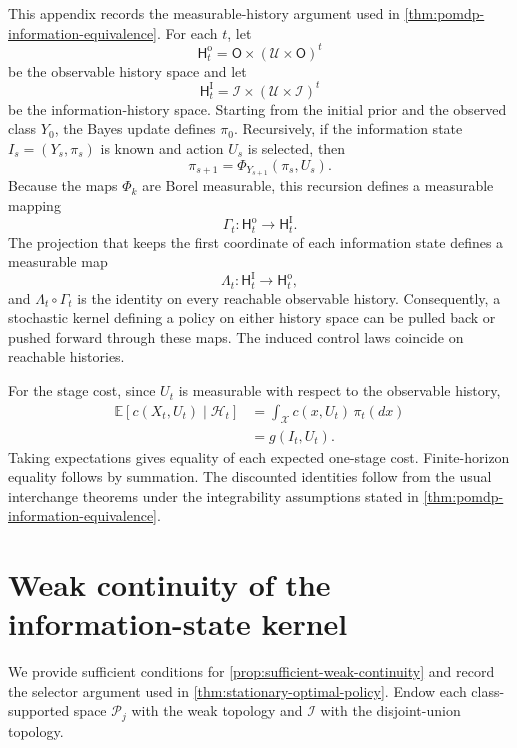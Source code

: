 \documentclass[10pt,twocolumn]{article}
\theoremstyle{remark}
\newcommand{\E}{\mathbb{E}}
\newcommand{\Hh}{\mathcal{H}}
\newcommand{\Pcal}{\mathcal{P}}
\newcommand{\Ucal}{\mathcal{U}}
\newcommand{\Xcal}{\mathcal{X}}
\newcommand{\Ical}{\mathcal{I}}
\begin{document}
This appendix records the measurable-history argument used in \cref{thm:pomdp-information-equivalence}. For each $t$, let
\[
\mathsf H_t^{\mathrm o}
=\mathsf O\times(\Ucal\times\mathsf O)^t
\]
be the observable history space and let
\[
\mathsf H_t^{\mathrm I}
=\Ical\times(\Ucal\times\Ical)^t
\]
be the information-history space. Starting from the initial prior and the observed class $Y_0$, the Bayes update defines $\pi_0$. Recursively, if the information state $I_s=(Y_s,\pi_s)$ is known and action $U_s$ is selected, then
\[
\pi_{s+1}=\Phi_{Y_{s+1}}(\pi_s,U_s).
\]
Because the maps $\Phi_k$ are Borel measurable, this recursion defines a measurable mapping
\[
\Gamma_t:\mathsf H_t^{\mathrm o}\longrightarrow\mathsf H_t^{\mathrm I}.
\]
The projection that keeps the first coordinate of each information state defines a measurable map
\[
\Lambda_t:\mathsf H_t^{\mathrm I}\longrightarrow\mathsf H_t^{\mathrm o},
\]
and $\Lambda_t\circ\Gamma_t$ is the identity on every reachable observable history. Consequently, a stochastic kernel defining a policy on either history space can be pulled back or pushed forward through these maps. The induced control laws coincide on reachable histories.

For the stage cost, since $U_t$ is measurable with respect to the observable history,
\begin{align*}
	\E[c(X_t,U_t)\mid\Hh_t]
	&=\int_{\Xcal}c(x,U_t)\,\pi_t(dx)\\
	&=g(I_t,U_t).
\end{align*}
Taking expectations gives equality of each expected one-stage cost. Finite-horizon equality follows by summation. The discounted identities follow from the usual interchange theorems under the integrability assumptions stated in \cref{thm:pomdp-information-equivalence}.


\section{Weak continuity of the information-state kernel}
\label{app:weak-continuity-kernel}

We provide sufficient conditions for \cref{prop:sufficient-weak-continuity} and record the selector argument used in \cref{thm:stationary-optimal-policy}. Endow each class-supported space \(\Pcal_j\) with the weak topology and \(\Ical\) with the disjoint-union topology.
\end{document}
